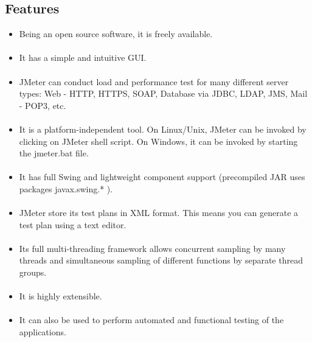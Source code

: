 \documentclass[../thesis.tex]{subfiles}
\begin{document}
\subsection*{Features}
\begin{itemize}
  \item Being an open source software, it is freely available.
  \paragraph{}
  \item It has a simple and intuitive GUI.
  \paragraph{}
  \item JMeter can conduct load and performance test for many different server types: Web - HTTP, HTTPS, SOAP, Database via JDBC, LDAP, JMS, Mail - POP3, etc.
  \paragraph{}
  \item It is a platform-independent tool. On Linux/Unix, JMeter can be invoked by clicking on JMeter shell script. On Windows, it can be invoked by starting the jmeter.bat file.
  \paragraph{}
  \item It has full Swing and lightweight component support (precompiled JAR uses packages javax.swing.* ).
  \paragraph{}
  \item JMeter store its test plans in XML format. This means you can generate a test plan using a text editor.
  \paragraph{}
  \item Its full multi-threading framework allows concurrent sampling by many threads and simultaneous sampling of different functions by separate thread groups.
  \paragraph{}
  \item It is highly extensible.
  \paragraph{}
  \item It can also be used to perform automated and functional testing of the applications.
  \paragraph{}
\end{itemize}
\end{document}
